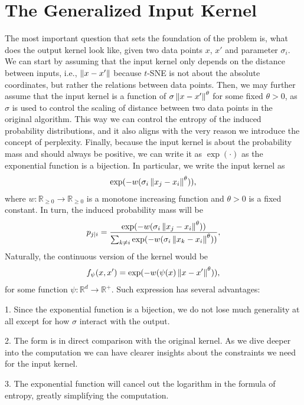 \documentclass[10pt]{article}
\begin{document}
\section{The Generalized Input Kernel}
The most important question that sets the foundation of the problem is, what
does the output kernel look like, given two data points $x$, $x'$ and parameter
$\sigma_i$. We can start by assuming that the input kernel only depends on the
distance between inputs, i.e., $\left\lVert x-x'\right\rVert$ because $t$-SNE is not about the
absolute coordinates, but rather the relations between data points. Then, we
may further assume that the input kernel is a function of $\sigma
    \left\lVert x-x'\right\rVert^{\theta}$ for some fixed $\theta >0$, as $\sigma$ is used to
control the scaling of distance between two data points in the original
algorithm. This way we can control the entropy of the induced probability
distributions, and it also aligns with the very reason we introduce the concept
of perplexity. Finally, because the input kernel is about the probability mass
and should always be positive, we can write it as $\exp(\cdot)$ as the
exponential function is a bijection. In particular, we write the input kernel
as
\begin{align}
    \exp(-w(\sigma_i\left\lVert x_j-x_i\right\rVert^{\theta})),
\end{align}
where $w: \mathbb{R}_{\geq 0} \to \mathbb{R}_{\geq 0}$ is a monotone increasing function and $\theta > 0$ is a fixed constant. In turn, the induced probability mass will be
\begin{align}
    p_{j|i} = \frac{\exp(-w(\sigma_i\left\lVert x_j-x_i\right\rVert^{\theta}))}{\sum_{k \neq i}\exp(-w(\sigma_i\left\lVert x_k-x_i\right\rVert^{\theta}))},
\end{align}
Naturally, the continuous version of the kernel would be
\begin{align}
    f_{\psi}(x,x') = \exp(-w(\psi(x)\left\lVert x-x'\right\rVert^{\theta})),
\end{align}
for some function $\psi: \mathbb{R}^d \to \mathbb{R}^+$. Such expression has several advantages:

1. Since the exponential function is a bijection, we do not lose much generality at all except for how $\sigma$ interact with the output.

2. The form is in direct comparison with the original kernel. As we dive deeper into the computation we can have clearer insights about the constraints we need for the input kernel.

3. The exponential function will cancel out the logarithm in the formula of entropy, greatly simplifying the computation.
\end{document}
